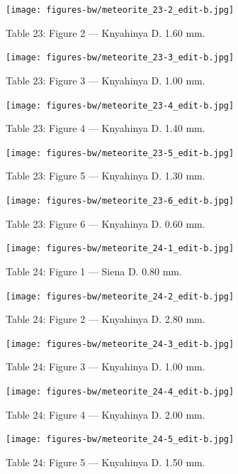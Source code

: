 \documentclass[a4paper, 12pt, oneside]{article}
\begin{document}
\clearpage
\begin{figure}[t]
\texttt{[image: figures-bw/meteorite\_23-2\_edit-b.jpg]}
\caption{Table 23: Figure 2 --- Knyahinya D. 1.60 mm.}
\centering
\end{figure}
\clearpage
\begin{figure}[t]
\texttt{[image: figures-bw/meteorite\_23-3\_edit-b.jpg]}
\caption{Table 23: Figure 3 --- Knyahinya D. 1.00 mm.}
\centering
\end{figure}
\clearpage
\begin{figure}[t]
\texttt{[image: figures-bw/meteorite\_23-4\_edit-b.jpg]}
\caption{Table 23: Figure 4 --- Knyahinya D. 1.40 mm.}
\centering
\end{figure}
\clearpage
\begin{figure}[t]
\texttt{[image: figures-bw/meteorite\_23-5\_edit-b.jpg]}
\caption{Table 23: Figure 5 --- Knyahinya D. 1.30 mm.}
\centering
\end{figure}
\clearpage
\begin{figure}[t]
\texttt{[image: figures-bw/meteorite\_23-6\_edit-b.jpg]}
\caption{Table 23: Figure 6 --- Knyahinya D. 0.60 mm.}
\centering
\end{figure}
\clearpage
{}
\begin{figure}[t]
\texttt{[image: figures-bw/meteorite\_24-1\_edit-b.jpg]}
\caption{Table 24: Figure 1 --- Siena D. 0.80 mm.}
\centering
\end{figure}
\clearpage
\begin{figure}[t]
\texttt{[image: figures-bw/meteorite\_24-2\_edit-b.jpg]}
\caption{Table 24: Figure 2 --- Knyahinya D. 2.80 mm.}
\centering
\end{figure}
\clearpage
\begin{figure}[t]
\texttt{[image: figures-bw/meteorite\_24-3\_edit-b.jpg]}
\caption{Table 24: Figure 3 --- Knyahinya D. 1.00 mm.}
\centering
\end{figure}
\clearpage
\begin{figure}[t]
\texttt{[image: figures-bw/meteorite\_24-4\_edit-b.jpg]}
\caption{Table 24: Figure 4 --- Knyahinya D. 2.00 mm.}
\centering
\end{figure}
\clearpage
\begin{figure}[t]
\texttt{[image: figures-bw/meteorite\_24-5\_edit-b.jpg]}
\caption{Table 24: Figure 5 --- Knyahinya D. 1.50 mm.}
\centering
\end{figure}
\end{document}

